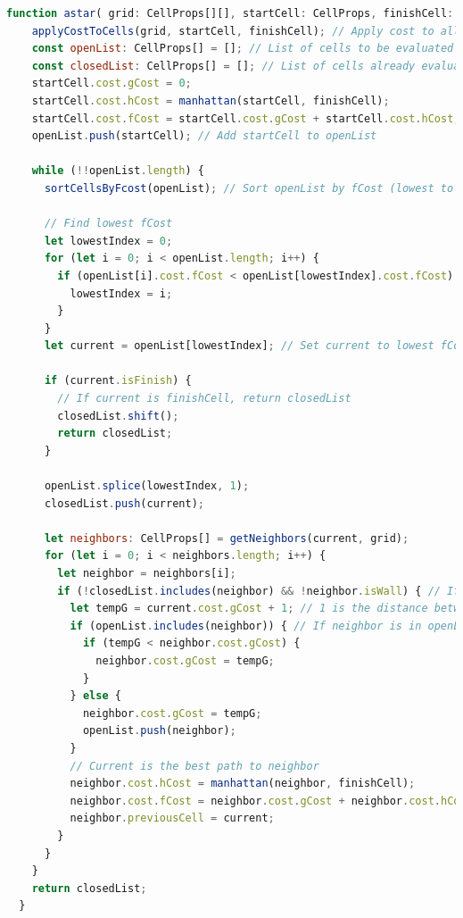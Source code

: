 \documentclass[12pt]{article}
\begin{document}
\begin{lstlisting}[language=JavaScript, caption=Udvalgt kode af A* algoritmen, label={lst:A*}]
  function astar( grid: CellProps[][], startCell: CellProps, finishCell: CellProps) {
    applyCostToCells(grid, startCell, finishCell); // Apply cost to all cells
    const openList: CellProps[] = []; // List of cells to be evaluated
    const closedList: CellProps[] = []; // List of cells already evaluated
    startCell.cost.gCost = 0;
    startCell.cost.hCost = manhattan(startCell, finishCell);
    startCell.cost.fCost = startCell.cost.gCost + startCell.cost.hCost;
    openList.push(startCell); // Add startCell to openList
  
    while (!!openList.length) {
      sortCellsByFcost(openList); // Sort openList by fCost (lowest to highest)
  
      // Find lowest fCost 
      let lowestIndex = 0;
      for (let i = 0; i < openList.length; i++) {
        if (openList[i].cost.fCost < openList[lowestIndex].cost.fCost) {
          lowestIndex = i;
        }
      }
      let current = openList[lowestIndex]; // Set current to lowest fCost
    
      if (current.isFinish) {
        // If current is finishCell, return closedList
        closedList.shift();
        return closedList;
      }
  
      openList.splice(lowestIndex, 1);
      closedList.push(current);
  
      let neighbors: CellProps[] = getNeighbors(current, grid);
      for (let i = 0; i < neighbors.length; i++) {
        let neighbor = neighbors[i];
        if (!closedList.includes(neighbor) && !neighbor.isWall) { // If neighbor is not in closedList and is not a wall
          let tempG = current.cost.gCost + 1; // 1 is the distance between current and neighbor
          if (openList.includes(neighbor)) { // If neighbor is in openList
            if (tempG < neighbor.cost.gCost) {
              neighbor.cost.gCost = tempG;
            }
          } else {
            neighbor.cost.gCost = tempG;
            openList.push(neighbor);
          }
          // Current is the best path to neighbor 
          neighbor.cost.hCost = manhattan(neighbor, finishCell);
          neighbor.cost.fCost = neighbor.cost.gCost + neighbor.cost.hCost;
          neighbor.previousCell = current;
        }
      }
    }
    return closedList;
  }
\end{lstlisting}
\newpage
\end{document}
